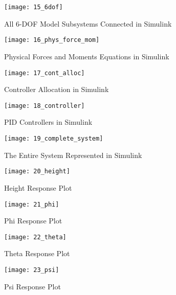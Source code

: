 \begin{figure}[h]
    \centering
    \texttt{[image: 15\_6dof]}
    \caption{All 6-DOF Model Subsystems Connected in Simulink}
    \label{fig:6dof}
\end{figure}

\begin{figure}[h]
    \centering
    \texttt{[image: 16\_phys\_force\_mom]}
    \caption{Physical Forces and Moments Equations in Simulink}
    \label{fig:phys_force_mom}
\end{figure}

\begin{figure}[h]
    \centering
    \texttt{[image: 17\_cont\_alloc]}
    \caption{Controller Allocation in Simulink}
    \label{fig:cont_alloc}
\end{figure}

\begin{figure}[h]
    \centering
    \texttt{[image: 18\_controller]}
    \caption{PID Controllers in Simulink}
    \label{fig:cont}
\end{figure}

\begin{figure}[h]
    \centering
    \texttt{[image: 19\_complete\_system]}
    \caption{The Entire System Represented in Simulink}
    \label{fig:}
\end{figure}

\begin{figure}[h]
    \centering
    \texttt{[image: 20\_height]}
    \caption{Height Response Plot}
    \label{fig:height}
\end{figure}

\begin{figure}[h]
    \centering
    \texttt{[image: 21\_phi]}
    \caption{Phi Response Plot}
    \label{fig:phi}
\end{figure}

\begin{figure}[h]
    \centering
    \texttt{[image: 22\_theta]}
    \caption{Theta Response Plot}
    \label{fig:theta}
\end{figure}

\begin{figure}[h]
    \centering
    \texttt{[image: 23\_psi]}
    \caption{Psi Response Plot}
    \label{fig:psi}
\end{figure}